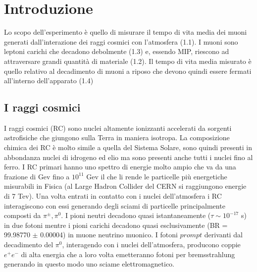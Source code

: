 \documentclass{standalone}
\begin{document}
	\pagestyle{fancy}
	\lhead{\rightmark}
	\rhead{\thepage}


\chapter{Introduzione}
Lo scopo dell'esperimento è quello di misurare il tempo di vita media dei muoni generati dall'interazione dei raggi cosmici con l'atmosfera (1.1). I muoni sono leptoni carichi che decadono debolmente (1.3) e, essendo MIP, riescono ad attraversare grandi quantità di materiale (1.2). Il tempo di vita media misurato è quello relativo al decadimento di muoni a riposo che devono quindi essere fermati all'interno dell'apparato (1.4)

\section{I raggi cosmici}
I raggi cosmici (RC) sono nuclei altamente ionizzanti accelerati da sorgenti astrofisiche che giungono sulla Terra in maniera isotropa. La composizione chimica dei RC è molto simile a quella del Sistema Solare, sono quindi presenti in abbondanza nuclei di idrogeno ed elio ma sono presenti anche tutti i nuclei fino al ferro.
I RC primari hanno uno spettro di energie molto ampio che va da una frazione di Gev fino a $10^{11}$ Gev il che li rende le particelle più energetiche misurabili in Fisica (al Large Hadron Collider del CERN si raggiungono energie di 7 Tev).
Una volta entrati in contatto con i nuclei dell'atmosfera i RC interagiscono con essi generando degli sciami di particelle principalmente composti da $\pi^\pm, \pi^0$.
I pioni neutri decadono quasi istantaneamente ($\tau \sim 10^{-17}$ s) in due fotoni mentre i pioni carichi decadono quasi esclusivamente (BR = 99.98770 $\pm$ 0.00004) in muone neutrino muonico.
I fotoni $prompt$ derivanti dal decadimento del $\pi^0$, interagendo con i nuclei dell'atmosfera, producono coppie $e^+e^-$ di alta energia che a loro volta emetteranno fotoni per bremsstrahlung generando in questo modo uno sciame elettromagnetico.
\end{document}
